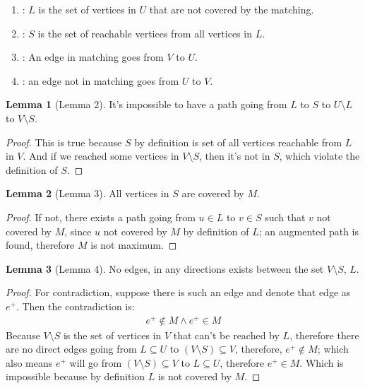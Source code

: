 \documentclass[]{article}
\theoremstyle{definition}
\newtheorem{lemma}{Lemma}[subsection]  %
\begin{document}
    \begin{enumerate}
        \item [(1.0.2)]: $L$ is the set of vertices in $U$ that are not covered by the matching. 
        \item [(1.0.3)]: $S$ is the set of reachable vertices from all vertices in $L$.  
        \item [(1.0.4)]: An edge in matching goes from $V$ to $U$. 
        \item [(1.0.5)]: an edge not in matching goes from $U$ to $V$. 
    \end{enumerate}
    \begin{lemma}[Lemma 2]\label{lemma:konig_2}
        It's impossible to have a path going from $L$ to $S$ to $U\setminus L$ to $V\setminus S$. 
    \end{lemma}
    \begin{proof}
        This is true because $S$ by definition is set of all vertices reachable from $L$ in $V$.  And if we reached some vertices in $V\setminus S$, then it's not in $S$, which violate the definition of $S$. 
    \end{proof}
    \begin{lemma}[Lemma 3]\label{lemma:konig_3}
        All vertices in $S$ are covered by $M$. 
    \end{lemma}
    \begin{proof}
        If not, there exists a path going from $u\in L$ to $v\in S$ such that $v$ not covered by $M$, since $u$ not covered by $M$ by definition of $L$; an augmented path is found, therefore $M$ is not maximum. 
    \end{proof}
    \begin{lemma}[Lemma 4]\label{lemma:konig_4}
        No edges, in any directions exists between the set $V\setminus S$, $L$.
    \end{lemma}
    \begin{proof}
        
        For contradiction, suppose there is such an edge and denote that edge as $e^+$. Then the contradiction is: 
        \begin{align}
            e^+ \not \in M \wedge e^+\in M
        \end{align}
        Because $V\setminus S$ is the set of vertices in $V$ that can't be reached by $L$, therefore there are no direct edges going from $L\subseteq U$ to $(V\setminus S)\subseteq V$, therefore, $e^+\not\in M$; which also means $e^+$ will go from $(V\setminus S)\subseteq V$ to $L\subseteq U$, therefore $e^+\in M$. Which is impossible because by definition $L$ is not covered by $M$.
    \end{proof} 
\end{document}

